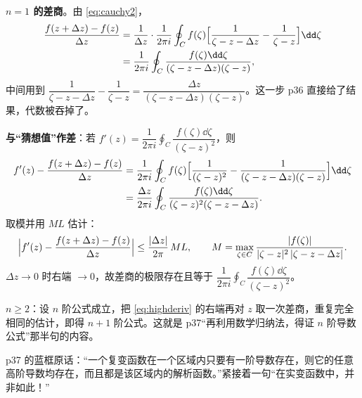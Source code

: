 \textbf{$n=1$ 的差商}。由 \eqref{eq:cauchy2}，
\begin{align}
\frac{f(z+\Delta z)-f(z)}{\Delta z}
&=\frac{1}{\Delta z}\cdot\frac{1}{2\pi i}\oint_C f(\zeta)
\Bigl[\frac{1}{\zeta-z-\Delta z}-\frac{1}{\zeta-z}\Bigr]\dd\zeta\notag\\
&=\frac{1}{2\pi i}\oint_C\frac{f(\zeta)\dd\zeta}{(\zeta-z-\Delta z)(\zeta-z)} ,
\end{align}
中间用到 $\dfrac{1}{\zeta-z-\Delta z}-\dfrac{1}{\zeta-z}=\dfrac{\Delta z}{(\zeta-z-\Delta z)(\zeta-z)}$。这一步 p36 直接给了结果，代数被吞掉了。

\textbf{与“猜想值”作差}：若 $f'(z)=\dfrac{1}{2\pi i}\displaystyle\oint_C\dfrac{f(\zeta)\dd\zeta}{(\zeta-z)^{2}}$，则
\begin{align}
f'(z)-\frac{f(z+\Delta z)-f(z)}{\Delta z}
&=\frac{1}{2\pi i}\oint_C f(\zeta)\Bigl[\frac{1}{(\zeta-z)^{2}}-\frac{1}{(\zeta-z-\Delta z)(\zeta-z)}\Bigr]\dd\zeta\notag\\
&=\frac{\Delta z}{2\pi i}\oint_C\frac{f(\zeta)\dd\zeta}{(\zeta-z)^{2}(\zeta-z-\Delta z)} .
\end{align}
取模并用 $ML$ 估计：
\[ \Bigl|f'(z)-\frac{f(z+\Delta z)-f(z)}{\Delta z}\Bigr|
\le\frac{|\Delta z|}{2\pi}\,M L,\qquad
M=\max_{\zeta\in C}\frac{|f(\zeta)|}{|\zeta-z|^{2}\,|\zeta-z-\Delta z|} . \]
$\Delta z\to0$ 时右端 $\to0$，故差商的极限存在且等于 $\dfrac{1}{2\pi i}\displaystyle\oint_C\dfrac{f(\zeta)\dd\zeta}{(\zeta-z)^{2}}$。


\textbf{$n\ge2$}：设 $n$ 阶公式成立，把 \eqref{eq:highderiv} 的右端再对 $z$ 取一次差商，重复完全相同的估计，即得 $n+1$ 阶公式。这就是 p37“再利用数学归纳法，得证 $n$ 阶导数公式”那半句的内容。



p37 的蓝框原话：“一个复变函数在一个区域内只要有一阶导数存在，则它的任意高阶导数均存在，而且都是该区域内的解析函数。”紧接着一句“在实变函数中，并非如此！”

